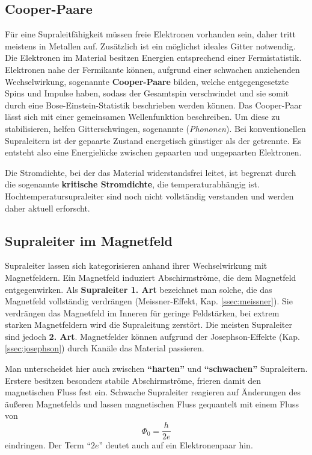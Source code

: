 \documentclass[a4paper,ngerman]{scrartcl}
\begin{document}
\subsection{Cooper-Paare}

Für eine Supraleitfähigkeit müssen freie Elektronen vorhanden sein, daher tritt meistens in Metallen auf. %
Zusätzlich ist ein möglichst ideales Gitter notwendig.
Die Elektronen im Material besitzen Energien entsprechend einer Fermistatistik.
Elektronen nahe der Fermikante können, aufgrund einer schwachen anziehenden Wechselwirkung, sogenannte \textbf{Cooper-Paare} bilden, 
welche entgegengesetzte Spins und Impulse haben, sodass der Gesamtspin verschwindet und sie somit durch eine Bose-Einstein-Statistik beschrieben werden können.
Das Cooper-Paar lässt sich mit einer gemeinsamen Wellenfunktion beschreiben. 
Um diese zu stabilisieren, helfen Gitterschwingen, sogenannte (\textit{Phononen}). 
Bei konventionellen Supraleitern ist der gepaarte Zustand energetisch günstiger als der getrennte.
Es entsteht also eine Energielücke zwischen gepaarten und ungepaarten Elektronen. 

Die Stromdichte, bei der das Material widerstandsfrei leitet, ist begrenzt durch die sogenannte \textbf{kritische Stromdichte}, die temperaturabhängig ist.
Hochtemperatursupraleiter sind noch nicht vollständig verstanden und werden daher aktuell erforscht.



\subsection{Supraleiter im Magnetfeld}

Supraleiter lassen sich kategorisieren anhand ihrer Wechselwirkung mit Magnetfeldern. 
Ein Magnetfeld induziert Abschirmströme, die dem Magnetfeld entgegenwirken.
Als \textbf{Supraleiter 1. Art} bezeichnet man solche, die das Magnetfeld vollständig verdrängen (Meissner-Effekt, Kap. \ref{ssec:meissner}).  
Sie verdrängen das Magnetfeld im Inneren für geringe Feldstärken, bei extrem starken Magnetfeldern wird die Supraleitung zerstört.
Die meisten Supraleiter sind jedoch \textbf{2. Art}.
Magnetfelder können aufgrund der Josephson-Effekte (Kap. \ref{ssec:josephson}) durch Kanäle das Material passieren.

Man unterscheidet hier auch zwischen \textbf{"`harten"'} und \textbf{"`schwachen"'} Supraleitern.
Erstere besitzen besonders stabile Abschirmströme, frieren damit den magnetischen Fluss fest ein.
Schwache Supraleiter reagieren auf Änderungen des äußeren Magnetfelds und lassen magnetischen Fluss gequantelt mit einem Fluss von
\begin{equation}
\Phi_\mathrm{0} = \frac{h}{2 e}
\end{equation}
eindringen. 
Der Term "`$2 e$"' deutet auch auf ein Elektronenpaar hin.
\end{document}
